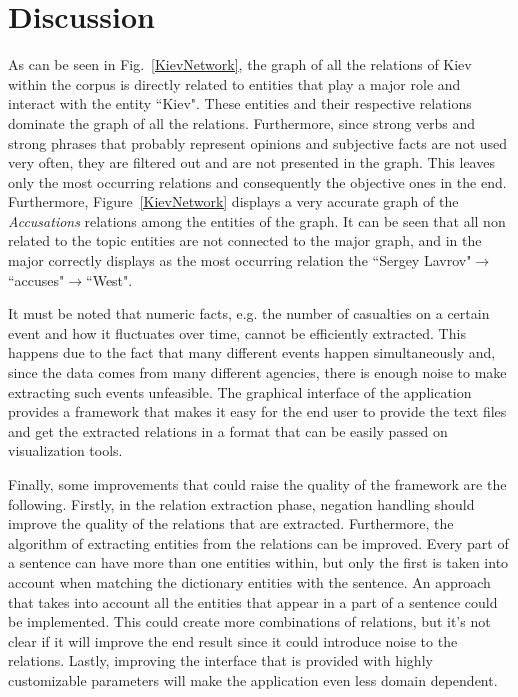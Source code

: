 \documentclass[]{article}
\begin{document}
\section{Discussion}
%
As can be seen in Fig.~\ref{KievNetwork}, the graph of all the relations of Kiev within the corpus is directly related to entities that play a major role and interact with the entity ``Kiev". These entities and their respective relations dominate the graph of all the relations. Furthermore, since strong verbs and strong phrases that probably represent opinions and subjective facts are not used very often, they are filtered out and are not presented in the graph. This leaves only the most occurring relations and consequently the objective ones in the end. Furthermore, Figure~\ref{KievNetwork} displays a very accurate graph of the \textit{Accusations} relations among the entities of the graph. It can be seen that all non related to the topic entities are not connected to the major graph, and in the major correctly displays as the most occurring relation the ``Sergey Lavrov"$\to$``accuses"$\to$``West".

It must be noted that numeric facts, e.g. the number of casualties on a certain event and how it fluctuates over time, cannot be efficiently extracted. This happens due to the fact that many different events happen simultaneously and, since the data comes from many different agencies, there is enough noise to make extracting such events unfeasible. The graphical interface of the application provides a framework that makes it easy for the end user to provide the text files and get the extracted relations in a format that can be easily passed on visualization tools. 

Finally, some improvements that could raise the quality of the framework are the following. Firstly, in the relation extraction phase, negation handling  should improve the quality of the relations that are extracted. Furthermore, the algorithm of extracting entities from the relations can be improved. Every part of a sentence can have more than one entities within, but only the first is taken into account when matching the dictionary entities with the sentence. An approach that takes into account all the entities that appear in a part of a sentence could be implemented. This could create more combinations of relations, but it's not clear if it will improve the end result since it could introduce noise to the relations. Lastly, improving the interface that is provided with highly customizable parameters will make the application even less domain dependent.
%
\end{document}
